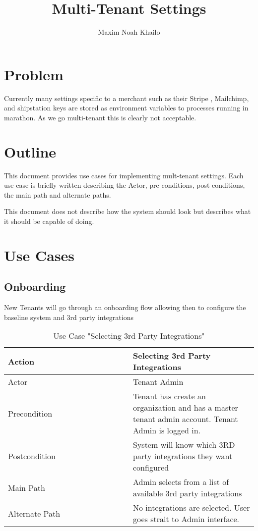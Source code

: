 \documentclass[11pt]{article}
\title{Multi-Tenant Settings}
\author{Maxim Noah Khailo}
\newcommand\tabularhead[1]{
\begin{table}[h]
    \caption{Use Case "#1"}
  \begin{tabular}{|p{0.5\linewidth}|p{0.66\linewidth}|}
    \hline
    \textbf{Action} & \textbf{#1} \\
    \hline}
\newcommand\addrow[2]{#1 &#2\\ \hline}
\newenvironment{usecase}{\tabularhead}
{\hline\end{tabular}\end{table}}
\begin{document}
\maketitle
\section{Problem}

Currently many settings specific to a merchant such as their Stripe , Mailchimp, and
shipstation keys are stored as environment variables to processes running in
marathon. As we go multi-tenant this is clearly not acceptable. 

\section{Outline}

This document provides use cases for implementing mult-tenant settings. Each
use case is briefly written describing the Actor, pre-conditions, post-conditions,
the main path and alternate paths.

This document does not describe how the system should look but describes what it
should be capable of doing.

\section{Use Cases}

\subsection{Onboarding}

New Tenants will go through an onboarding flow allowing then to configure the 
baseline system and 3rd party integrations

\begin{usecase}{Selecting 3rd Party Integrations}
    \addrow{Actor}{Tenant Admin}
    \addrow{Precondition}{Tenant has create an organization and has a master tenant admin account. Tenant Admin is logged in.}
    \addrow{Postcondition}{System will know which 3RD party integrations they want configured}
    \addrow{Main Path}{Admin selects from a list of available 3rd party integrations}
    \addrow{Alternate Path}{No integrations are selected. User goes strait to Admin interface.}
\end{usecase}
\end{document}
